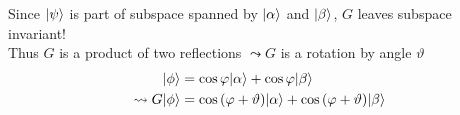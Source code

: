 Since $\lvert\psi\rangle$ is part of subspace spanned by $\lvert\alpha\rangle$ and $\lvert\beta\rangle$, 
$G$ leaves subspace invariant! \\
Thus $G$ is a product of two reflections $\leadsto G$ is a rotation by angle 
$\vartheta$
\begin{align}
    \lvert\phi\rangle &= \cos{\varphi} \lvert\alpha\rangle + \cos{\varphi} \lvert\beta\rangle \\
    \leadsto G \lvert\phi\rangle &= \cos{(\varphi + \vartheta)} \lvert\alpha\rangle + \cos{(\varphi + \vartheta)} \lvert\beta\rangle
\end{align}